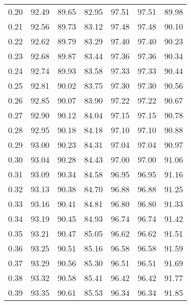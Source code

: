 \begin{tabular}{|c|c|c|c|c|c|c|}
      0.20 &     92.49 &     89.65 &      82.95 &   97.51 &      97.51 &         89.98 \\
      0.21 &     92.56 &     89.73 &      83.12 &   97.48 &      97.48 &         90.10 \\
      0.22 &     92.62 &     89.79 &      83.29 &   97.40 &      97.40 &         90.23 \\
      0.23 &     92.68 &     89.87 &      83.44 &   97.36 &      97.36 &         90.34 \\
      0.24 &     92.74 &     89.93 &      83.58 &   97.33 &      97.33 &         90.44 \\
      0.25 &     92.81 &     90.02 &      83.75 &   97.30 &      97.30 &         90.56 \\
      0.26 &     92.85 &     90.07 &      83.90 &   97.22 &      97.22 &         90.67 \\
      0.27 &     92.90 &     90.12 &      84.04 &   97.15 &      97.15 &         90.78 \\
      0.28 &     92.95 &     90.18 &      84.18 &   97.10 &      97.10 &         90.88 \\
      0.29 &     93.00 &     90.23 &      84.31 &   97.04 &      97.04 &         90.97 \\
      0.30 &     93.04 &     90.28 &      84.43 &   97.00 &      97.00 &         91.06 \\
      0.31 &     93.09 &     90.34 &      84.58 &   96.95 &      96.95 &         91.16 \\
      0.32 &     93.13 &     90.38 &      84.70 &   96.88 &      96.88 &         91.25 \\
      0.33 &     93.16 &     90.41 &      84.81 &   96.80 &      96.80 &         91.33 \\
      0.34 &     93.19 &     90.45 &      84.93 &   96.74 &      96.74 &         91.42 \\
      0.35 &     93.21 &     90.47 &      85.05 &   96.62 &      96.62 &         91.51 \\
      0.36 &     93.25 &     90.51 &      85.16 &   96.58 &      96.58 &         91.59 \\
      0.37 &     93.29 &     90.56 &      85.30 &   96.51 &      96.51 &         91.69 \\
      0.38 &     93.32 &     90.58 &      85.41 &   96.42 &      96.42 &         91.77 \\
      0.39 &     93.35 &     90.61 &      85.53 &   96.34 &      96.34 &         91.85 \\

\end{tabular}
